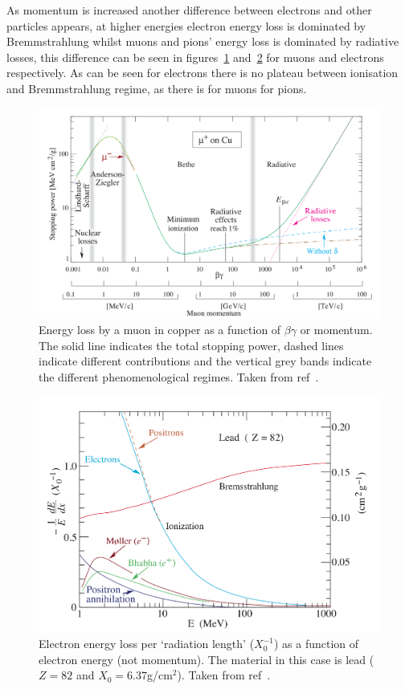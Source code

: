 As momentum is increased another difference between electrons and other particles appears, at higher energies electron energy loss is dominated by Bremmstrahlung whilst muons and pions' energy loss is dominated by radiative losses, this difference can be seen in figures~\ref{fig:mu-pi-bethe} and~\ref{fig:electron_energy_loss} for muons and electrons respectively. As can be seen for electrons there is no plateau between ionisation and Bremmstrahlung regime, as there is for muons for pions.  
\begin{figure}[hptb] 
  \centering
    \includegraphics[width=.9\textwidth]{images/mu-pi-bethe.png}
  \caption{Energy loss by a muon in copper as a function of \( \beta\gamma \) or momentum. The solid line indicates the total stopping power, dashed lines indicate different contributions and the vertical grey bands indicate the different phenomenological regimes. Taken from ref~\cite{pdg}.}
  \label{fig:mu-pi-bethe}
\end{figure}
\begin{figure}[hptb]
  \centering  
    \includegraphics[width=.9\textwidth]{images/electron_energy_loss.png}
  \caption{Electron energy loss per `radiation length' (\( X_0^{-1} \)) as a function of electron energy (not momentum). The material in this case is lead (\(Z=82\) and \(X_0 = 6.37\)g/cm\(^2\)). Taken from ref~\cite{pdg}.}
  \label{fig:electron_energy_loss}
\end{figure}

